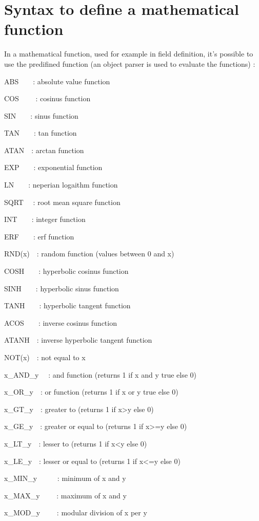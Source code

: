 \section{Syntax to define a mathematical function\label{parser}}
In a mathematical function,
used for example in field definition, it's possible to use the predifined function (an object parser is used to
evaluate the functions) :

ABS\ \ \ \ : absolute value function

COS \ \ \ \ : cosinus function

SIN\ \ \ \ : sinus function

TAN\ \ \ \ : tan function

ATAN\ \ : arctan function

EXP\ \ \ \ : exponential function

LN\ \ \ \ : neperian logaithm function

SQRT \ \ : root mean square function

INT\ \ \ \ : integer function

ERF\ \ \ \ : erf function

RND(x)\ \ : random function (values between 0 and x)

COSH\ \ \ \ : hyperbolic cosinus function

SINH\ \ \ \ : hyperbolic sinus function

TANH\ \ \ \ : hyperbolic tangent function

ACOS\ \ \ \ : inverse cosinus function

ATANH\ \ : inverse hyperbolic tangent function

NOT(x)\ \ : not equal to x 

x\_AND\_y \ \ : and function (returns 1 if x and y true else 0)

x\_OR\_y\ \ : or function (returns 1 if x or y true else 0)

x\_GT\_y\ \ : greater to (returns 1 if x{\textgreater}y else 0)

x\_GE\_y\ \ : greater or equal to (returns 1 if x{\textgreater}=y else 0)

x\_LT\_y\ \ : lesser to (returns 1 if x{\textless}y else 0)

x\_LE\_y\ \ : lesser or equal to (returns 1 if x{\textless}=y else 0)

x\_MIN\_y \ \ \ \ \ : minimum of x and y

x\_MAX\_y \ \ \ \ : maximum of x and y

x\_MOD\_y \ \ \ \ : modular division of x per y


